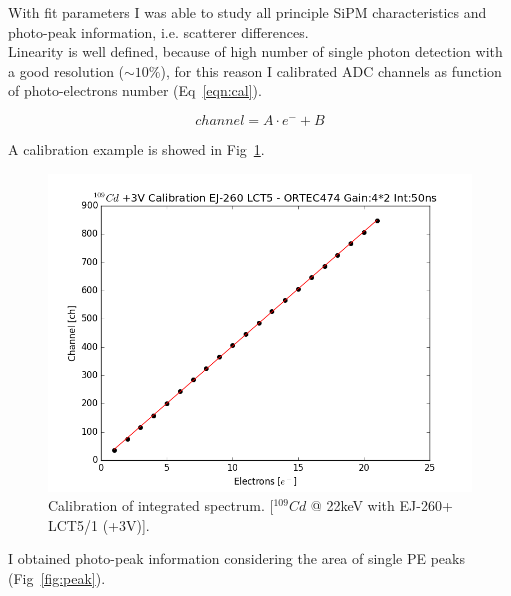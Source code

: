 \documentclass[10pt,a4paper, openany]{book}
\begin{document}
With fit parameters I was able to study all principle SiPM characteristics and photo-peak information, i.e. scatterer differences.\\
Linearity is well defined, because of high number of single photon detection with a good resolution ($\sim 10\%$), for this reason I calibrated ADC channels as function of photo-electrons number (Eq~\ref{eqn:cal}).

\begin{equation}
\label{eqn:cal}
channel = A \cdot e^- + B
\end{equation}

A calibration example is showed in Fig~\ref{fig:cal}.

\begin{figure}[!h]
\begin{center}
\includegraphics[scale=0.4]{imm/cal.png}
\end{center}
\caption{Calibration of integrated spectrum. [$^{109}Cd$ @ 22keV with EJ-260+ LCT5/1 (+3V)].} 
\label{fig:cal}
\end{figure}

I obtained photo-peak information considering the area of single PE peaks (Fig~\ref{fig:peak}).
\end{document}
